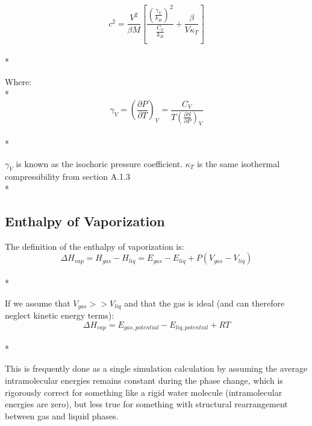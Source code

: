 \documentclass[a4paper,12pt]{article}
\begin{document}
\begin{equation}c^2 = \frac{V^2}{\beta M}\left[\frac{\left(\frac{\gamma_V}{k_B}\right)^2}{\frac{C_V}{k_B}} + \frac{\beta}{V \kappa_T}\right]\end{equation}\\*

 Where:\\*
\begin{equation}\gamma_V = \left(\frac{\partial P}{\partial T}\right)_{V} = \frac{C_V}{T \left(\frac{\partial S}{\partial P}\right)_{V}}\end{equation}\\*

 $\gamma_V$ is known as the isochoric pressure coefficient. $\kappa_T$ is the same isothermal compressibility from section A.1.3\\*


\subsection{Enthalpy of Vaporization}

 The definition of the enthalpy of vaporization is\cite{hvap}:
\begin{equation}\Delta H_{vap} = H_{gas} - H_{liq} = E_{gas} - E_{liq} + P(V_{gas} - V_{liq})\end{equation}\\*

 If we assume that $V_{gas} >> V_{liq}$ and that the gas is ideal 
(and can therefore neglect kinetic energy terms):
\begin{equation}\Delta H_{vap} = E_{gas, potential} - E_{liq, potential} + R T\end{equation}\\*

This is frequently done as a single simulation calculation by assuming
the average intramolecular energies remains constant during the phase
change, which is rigorously correct for something like a rigid water
molecule (intramolecular energies are zero), but less true for
something with structural rearrangement between gas and liquid phases. 
\end{document}
